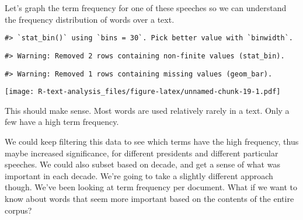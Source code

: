 \documentclass[]{book}
\newenvironment{Shaded}{\begin{snugshade}}{\end{snugshade}}
\newcommand{\DataTypeTok}[1]{\textcolor[rgb]{0.13,0.29,0.53}{#1}}
\newcommand{\FloatTok}[1]{\textcolor[rgb]{0.00,0.00,0.81}{#1}}
\newcommand{\KeywordTok}[1]{\textcolor[rgb]{0.13,0.29,0.53}{\textbf{#1}}}
\newcommand{\NormalTok}[1]{#1}
\newcommand{\OperatorTok}[1]{\textcolor[rgb]{0.81,0.36,0.00}{\textbf{#1}}}
\newcommand{\OtherTok}[1]{\textcolor[rgb]{0.56,0.35,0.01}{#1}}
\newcommand{\StringTok}[1]{\textcolor[rgb]{0.31,0.60,0.02}{#1}}
\begin{document}
\begin{Shaded}
\end{Shaded}

Let's graph the term frequency for one of these speeches so we can understand the frequency distribution of words over a text.

\begin{Shaded}
\end{Shaded}

\begin{verbatim}
#> `stat_bin()` using `bins = 30`. Pick better value with `binwidth`.
\end{verbatim}

\begin{verbatim}
#> Warning: Removed 2 rows containing non-finite values (stat_bin).
\end{verbatim}

\begin{verbatim}
#> Warning: Removed 1 rows containing missing values (geom_bar).
\end{verbatim}

\texttt{[image: R-text-analysis\_files/figure-latex/unnamed-chunk-19-1.pdf]}

This should make sense. Most words are used relatively rarely in a text. Only a few have a high term frequency.

We could keep filtering this data to see which terms have the high frequency, thus maybe increased significance, for different presidents and different particular speeches. We could also subset based on decade, and get a sense of what was important in each decade. We're going to take a slightly different approach though. We've been looking at term frequency per document. What if we want to know about words that seem more important based on the contents of the entire corpus?
\end{document}
